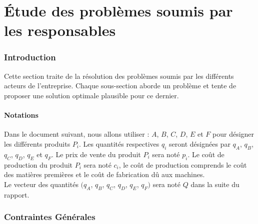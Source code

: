 \documentclass[paper=a4, fontsize=11pt]{report}
\numberwithin{equation}{section}		%
\numberwithin{figure}{section}			%
\numberwithin{table}{section}				%
\begin{document}


\tableofcontents

\newpage

\part{\'Etude des problèmes soumis par les responsables}

\section{Introduction}
Cette section traite de la résolution des problèmes soumis par les différents acteurs de l'entreprise. Chaque sous-section aborde un problème et tente de proposer une solution optimale plausible pour ce dernier.


\begin{shaded}
\vspace{-0.5cm}

\subsection*{Notations}
Dans le document suivant, nous allons utiliser : 
$A$, $B$, $C$, $D$, $E$ et $F$ pour désigner les différents produits $P_i$. Les quantités respectives $q_i$ seront désignées par $q_A$, $q_B$, $q_C$, $q_D$, $q_E$ et $q_F$. Le prix de vente du produit $P_i$ sera noté $p_i$. Le coût de production du produit $P_i$ sera noté $c_i$, le coût de production comprends le coût des matières premières et le coût de fabrication dû aux machines.\\

Le vecteur des quantités $(q_A$, $q_B$, $q_C$, $q_D$, $q_E$, $q_F)$ sera noté $Q$ dans la suite du rapport.
\end{shaded}

\section{Contraintes Générales}
\end{document}
